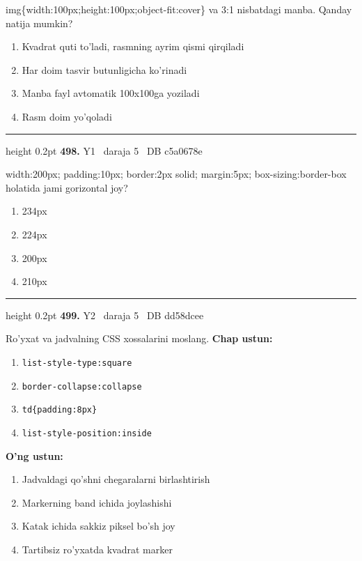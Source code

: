 \documentclass[10pt,a4paper,oneside]{article}
\begin{document}
\par
img\{width:100px;height:100px;object-fit:cover\} va 3:1 nisbatdagi manba. Qanday natija mumkin?
\begin{enumerate}[label=\Alph*),leftmargin=9mm]
\item Kvadrat quti to'ladi, rasmning ayrim qismi qirqiladi
\item Har doim tasvir butunligicha ko'rinadi
\item Manba fayl avtomatik 100x100ga yoziladi
\item Rasm doim yo'qoladi
\end{enumerate}
\vspace{2mm}\hrule height 0.2pt \vspace{4mm}
\hypertarget{q498}{\textbf{\color{ink}498.}}  {\color{muted}\scriptsize Y1 \textbullet\ daraja 5 \textbullet\ DB c5a0678e}
\par
width:200px; padding:10px; border:2px solid; margin:5px; box-sizing:border-box holatida jami gorizontal joy?
\begin{enumerate}[label=\Alph*),leftmargin=9mm]
\item 234px
\item 224px
\item 200px
\item 210px
\end{enumerate}
\vspace{2mm}\hrule height 0.2pt \vspace{4mm}
\hypertarget{q499}{\textbf{\color{ink}499.}}  {\color{muted}\scriptsize Y2 \textbullet\ daraja 5 \textbullet\ DB dd58dcee}
\par
Ro'yxat va jadvalning CSS xossalarini moslang.
\textbf{\footnotesize Chap ustun:}
\begin{enumerate}[label=\arabic*),leftmargin=9mm]
\item \texttt{list-style-type:square}
\item \texttt{border-collapse:collapse}
\item \texttt{td\{padding:8px\}}
\item \texttt{list-style-position:inside}
\end{enumerate}
\textbf{\footnotesize O'ng ustun:}
\begin{enumerate}[label=\Alph*),leftmargin=9mm]
\item Jadvaldagi qo'shni chegaralarni birlashtirish
\item Markerning band ichida joylashishi
\item Katak ichida sakkiz piksel bo'sh joy
\item Tartibsiz ro'yxatda kvadrat marker
\end{enumerate}
\end{document}
